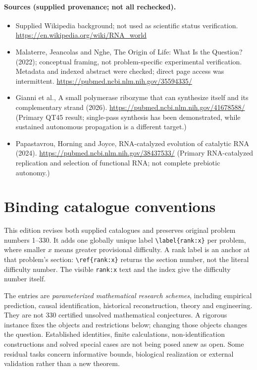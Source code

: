 \documentclass[11pt]{article}
\begin{document}
\paragraph{Sources (supplied provenance; not all rechecked).} \begin{itemize}
\item Supplied Wikipedia background; not used as scientific status verification. \url{https://en.wikipedia.org/wiki/RNA_world}
\item Malaterre, Jeancolas and Nghe, The Origin of Life: What Is the Question? (2022); conceptual framing, not problem-specific experimental verification. Metadata and indexed abstract were checked; direct page access was intermittent. \url{https://pubmed.ncbi.nlm.nih.gov/35594335/}
\item Gianni et al., A small polymerase ribozyme that can synthesize itself and its complementary strand (2026). \url{https://pubmed.ncbi.nlm.nih.gov/41678588/} (Primary QT45 result; single-pass synthesis has been demonstrated, while sustained autonomous propagation is a different target.)
\item Papastavrou, Horning and Joyce, RNA-catalyzed evolution of catalytic RNA (2024). \url{https://pubmed.ncbi.nlm.nih.gov/38437533/} (Primary RNA-catalyzed replication and selection of functional RNA; not complete prebiotic autonomy.)
\end{itemize}


\section*{Binding catalogue conventions}
This edition revises both supplied catalogues and preserves original problem numbers 1--330. It adds one globally unique label \verb|\label{rank:x}| per problem, where smaller $x$ means greater provisional difficulty. A rank label is an anchor at that problem's section: \verb|\ref{rank:x}| returns the section number, not the literal difficulty number. The visible \texttt{rank:x} text and the index give the difficulty number itself.

The entries are \emph{parameterized mathematical research schemes}, including empirical prediction, causal identification, historical reconstruction, theory and engineering. They are not 330 certified unsolved mathematical conjectures. A rigorous instance fixes the objects and restrictions below; changing those objects changes the question. Established identities, finite calculations, non-identification constructions and solved special cases are not being posed anew as open. Some residual tasks concern informative bounds, biological realization or external validation rather than a new theorem.
\end{document}
